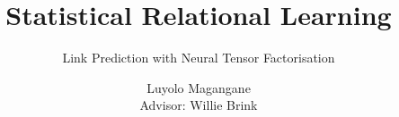 \graphicspath{{Figs/}} %
\title{Statistical Relational Learning}

\subtitle{ Link Prediction with Neural Tensor Factorisation}

\author{Luyolo Magangane \\[1cm]{\small Advisor: Willie Brink}}







